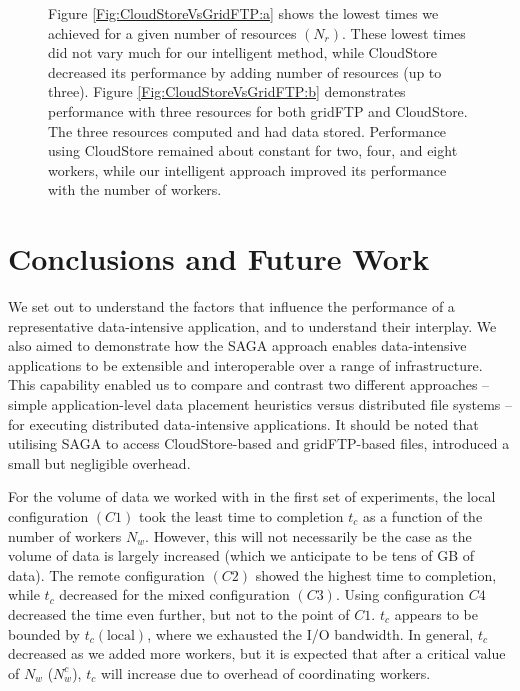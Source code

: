 \documentclass{rspublic}
\begin{document}
\begin{figure}
\begin{center}
{\label{Fig:CloudStoreVsGridFTP:b}
}
\caption{Figure \ref{Fig:CloudStoreVsGridFTP:a}
 shows the lowest times we achieved for a given number of resources
 $(N_{r})$. These lowest times did not vary much for our intelligent
 method, while CloudStore decreased its performance by adding number of
 resources (up to three). Figure \ref{Fig:CloudStoreVsGridFTP:b}
 demonstrates performance with three resources for both gridFTP and
 CloudStore. The three resources computed and had data stored.
 Performance using CloudStore remained about constant for two, four, and
 eight workers, while our intelligent approach improved its performance
 with the number of workers.}
\label{Fig:CloudStoreVsGridFTP}
\end{center}
\vspace{-0.3cm}
\end{figure}

%
\vspace{-0.3cm}

\section{Conclusions and Future Work}


We set out to understand the factors that influence the performance of
a representative data-intensive application, and to understand their
interplay. We also aimed to demonstrate how the SAGA approach enables
data-intensive applications to be extensible and interoperable over a
range of infrastructure.  This capability enabled us to compare and
contrast two different approaches -- simple application-level data
placement heuristics versus distributed file systems -- for executing
distributed data-intensive applications. It should be noted that 
utilising SAGA to access CloudStore-based and gridFTP-based files,
introduced a small but negligible overhead.

For the volume of data we worked with in the first set of experiments,
the local configuration $(C1)$ took the least time to completion $t_c$
as a function of the number of workers $N_w$. However, this will not
necessarily be the case as the volume of data is largely increased
(which we anticipate to be tens of GB of data).  The remote
configuration $(C2)$ showed the highest time to completion, while
$t_c$ decreased for the mixed configuration $(C3)$. Using
configuration $C4$ decreased the time even further, but not to the
point of $C1$. $t_c$ appears to be bounded by $t_c(\mbox{local})$,
where we exhausted the I/O bandwidth.  In general, $t_c$ decreased as
we added more workers, but it is expected that after a critical value
of $N_w$ ($N^c_w$), $t_c$ will increase due to overhead of
coordinating workers.
\end{document}
